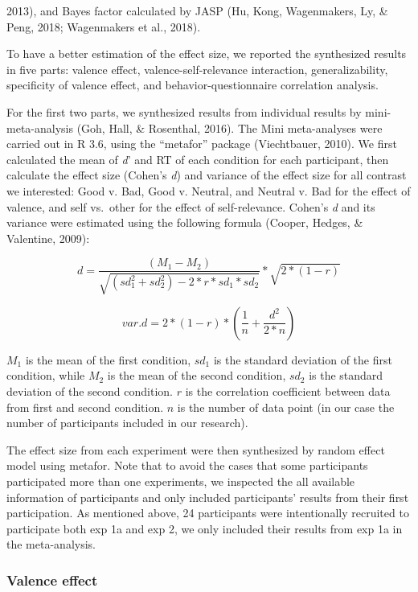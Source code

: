 \documentclass[man]{apa6}
\begin{document}
2013), and Bayes factor calculated by JASP (Hu, Kong, Wagenmakers, Ly, \& Peng, 2018; Wagenmakers et al., 2018).

To have a better estimation of the effect size, we reported the synthesized results in five parts: valence effect, valence-self-relevance interaction, generalizability, specificity of valence effect, and behavior-questionnaire correlation analysis.

For the first two parts, we synthesized results from individual results by mini-meta-analysis (Goh, Hall, \& Rosenthal, 2016). The Mini meta-analyses were carried out in R 3.6, using the \enquote{metafor} package (Viechtbauer, 2010). We first calculated the mean of \emph{d}' and RT of each condition for each participant, then calculate the effect size (Cohen's \emph{d}) and variance of the effect size for all contrast we interested: Good v. Bad, Good v. Neutral, and Neutral v. Bad for the effect of valence, and self vs.~other for the effect of self-relevance. Cohen's \emph{d} and its variance were estimated using the following formula (Cooper, Hedges, \& Valentine, 2009):

\[d = \frac {(M_{1} - M_{2})}{\sqrt {(sd_{1}^2 + sd_{2}^2) - 2*r*sd_{1}*sd_{2}}} * \sqrt {2*(1-r)}\]

\[var.d = 2*(1-r) * (\frac{1}{n} + \frac{d^2}{2*n})\]

\(M_1\) is the mean of the first condition, \(sd_1\) is the standard deviation of the first condition, while \(M_2\) is the mean of the second condition, \(sd_2\) is the standard deviation of the second condition. \(r\) is the correlation coefficient between data from first and second condition. \(n\) is the number of data point (in our case the number of participants included in our research).

The effect size from each experiment were then synthesized by random effect model using metafor. Note that to avoid the cases that some participants participated more than one experiments, we inspected the all available information of participants and only included participants' results from their first participation. As mentioned above, 24 participants were intentionally recruited to participate both exp 1a and exp 2, we only included their results from exp 1a in the meta-analysis.

\hypertarget{valence-effect}{%
\subsubsection{Valence effect}\label{valence-effect}}
\end{document}
